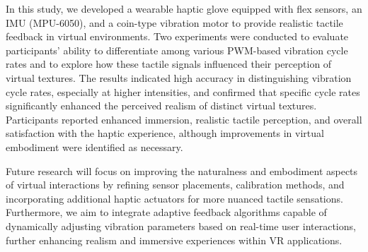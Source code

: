 \documentclass[graybox]{svmult}
\begin{document}
In this study, we developed a wearable haptic glove equipped with flex sensors, an IMU (MPU-6050), and a coin-type vibration motor to provide realistic tactile feedback in virtual environments. Two experiments were conducted to evaluate participants' ability to differentiate among various PWM-based vibration cycle rates and to explore how these tactile signals influenced their perception of virtual textures. The results indicated high accuracy in distinguishing vibration cycle rates, especially at higher intensities, and confirmed that specific cycle rates significantly enhanced the perceived realism of distinct virtual textures. Participants reported enhanced immersion, realistic tactile perception, and overall satisfaction with the haptic experience, although improvements in virtual embodiment were identified as necessary.

Future research will focus on improving the naturalness and embodiment aspects of virtual interactions by refining sensor placements, calibration methods, and incorporating additional haptic actuators for more nuanced tactile sensations. Furthermore, we aim to integrate adaptive feedback algorithms capable of dynamically adjusting vibration parameters based on real-time user interactions, further enhancing realism and immersive experiences within VR applications.



%
%
%
%

%


\end{document}
